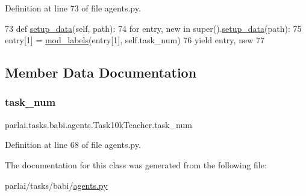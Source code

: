 Definition at line 73 of file agents.\+py.


\begin{DoxyCode}
73     \textcolor{keyword}{def }\hyperlink{namespaceparlai_1_1tasks_1_1multinli_1_1agents_a4fa2cb0ba1ed745336ad8bceed36b841}{setup\_data}(self, path):
74         \textcolor{keywordflow}{for} entry, new \textcolor{keywordflow}{in} super().\hyperlink{namespaceparlai_1_1tasks_1_1multinli_1_1agents_a4fa2cb0ba1ed745336ad8bceed36b841}{setup\_data}(path):
75             entry[1] = \hyperlink{namespaceparlai_1_1tasks_1_1babi_1_1agents_a80ee701751bc608fcb01bcfb1e884de0}{mod\_labels}(entry[1], self.task\_num)
76             \textcolor{keywordflow}{yield} entry, new
77 
\end{DoxyCode}


\subsection{Member Data Documentation}
\mbox{\label{classparlai_1_1tasks_1_1babi_1_1agents_1_1Task10kTeacher_a71c66ccc1c27b22f0e49863c0926d59c}} 
\subsubsection{\texorpdfstring{task\+\_\+num}{task\_num}}
{\footnotesize\ttfamily parlai.\+tasks.\+babi.\+agents.\+Task10k\+Teacher.\+task\+\_\+num}



Definition at line 68 of file agents.\+py.



The documentation for this class was generated from the following file\+:\begin{DoxyCompactItemize}
\item 
parlai/tasks/babi/\hyperlink{parlai_2tasks_2babi_2agents_8py}{agents.\+py}\end{DoxyCompactItemize}
